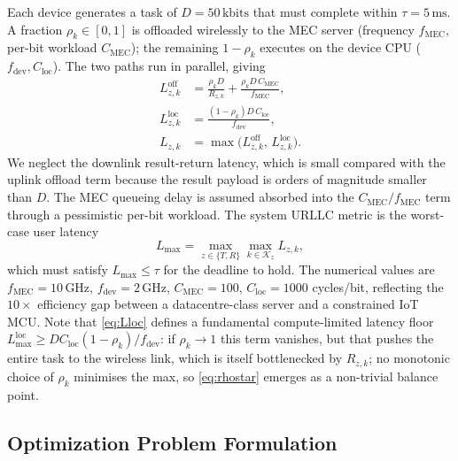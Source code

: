 \documentclass[journal]{IEEEtran}
\begin{document}
Each device generates a task of $D=50\,\text{kbits}$ that must
complete within $\tau=5\,\text{ms}$. A fraction $\rho_k\!\in\![0,1]$
is offloaded wirelessly to the MEC server (frequency
$f_{\mathrm{MEC}}$, per-bit workload $C_{\mathrm{MEC}}$); the
remaining $1-\rho_k$ executes on the device CPU
($f_{\mathrm{dev}},C_{\mathrm{loc}}$). The two paths run in parallel,
giving
\begin{subequations}
\label{eq:latuser}
\begin{align}
  L_{z,k}^{\mathrm{off}} &= \frac{\rho_k D}{R_{z,k}}+
                            \frac{\rho_k D\,C_{\mathrm{MEC}}}{f_{\mathrm{MEC}}}, \label{eq:Loff} \\
  L_{z,k}^{\mathrm{loc}} &= \frac{(1-\rho_k) D\,C_{\mathrm{loc}}}{f_{\mathrm{dev}}}, \label{eq:Lloc} \\
  L_{z,k}                &= \max\!\bigl(L_{z,k}^{\mathrm{off}},\,L_{z,k}^{\mathrm{loc}}\bigr). \label{eq:Lmax_user}
\end{align}
\end{subequations}
We neglect the downlink result-return latency, which is small
compared with the uplink offload term because the result payload is
orders of magnitude smaller than $D$. The MEC queueing delay is
assumed absorbed into the $C_{\mathrm{MEC}}/f_{\mathrm{MEC}}$ term
through a pessimistic per-bit workload. The system URLLC metric is
the worst-case user latency
\begin{equation}
  L_{\max}=\max_{z\in\{T,R\}}\max_{k\in\mathcal{K}_z} L_{z,k},
  \label{eq:lmax}
\end{equation}
which must satisfy $L_{\max}\!\le\!\tau$ for the deadline to hold.
The numerical values are $f_{\mathrm{MEC}}=10\,\text{GHz}$,
$f_{\mathrm{dev}}=2\,\text{GHz}$, $C_{\mathrm{MEC}}=100$,
$C_{\mathrm{loc}}=1000$ cycles/bit, reflecting the $10\!\times$
efficiency gap between a datacentre-class server and a constrained
IoT MCU. Note that \eqref{eq:Lloc} defines a fundamental
compute-limited latency floor
$L_{\max}^{\mathrm{loc}}\!\ge\!D C_{\mathrm{loc}}(1-\rho_k)/f_{\mathrm{dev}}$:
if $\rho_k\!\to\!1$ this term vanishes, but that pushes the entire
task to the wireless link, which is itself bottlenecked by
$R_{z,k}$; no monotonic choice of $\rho_k$ minimises the max, so
\eqref{eq:rhostar} emerges as a non-trivial balance point.

\subsection{Optimization Problem Formulation}
\label{sec:opt}
\end{document}
